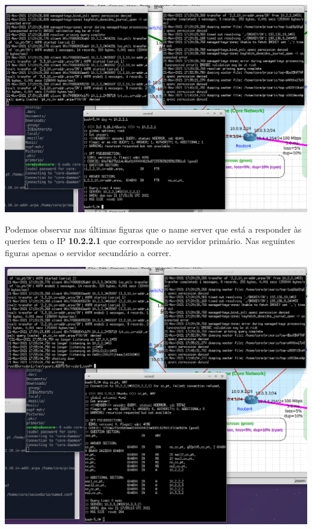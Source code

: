 \documentclass{report}
\begin{document}
        \par
	\vspace{0.45em}
 	\par
	\noindent
        \includegraphics[width=\textwidth]{images/reversoambos.png}
        \par
	\vspace{0.45em}
 	\par
	Podemos observar nas últimas figuras que o name server que está a responder às queries tem o IP \textbf{10.2.2.1} que corresponde ao servidor primário.
	Nas seguintes figuras apenas o servidor secundário a correr.
	\vspace{0.45em}
 	\par
	\noindent
        \includegraphics[width=\textwidth]{images/digum.png}
\end{document}
